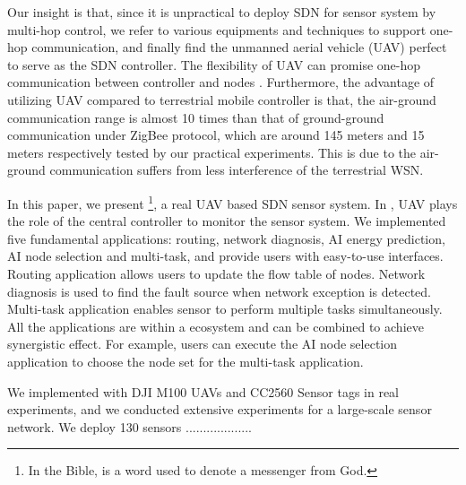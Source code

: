 Our insight is that, since it is unpractical to deploy SDN 
for sensor system by multi-hop control,
we refer to various equipments and techniques to support one-hop communication, 
and finally find the unmanned aerial vehicle (UAV) \cite{Cambone2005Unmanned, Perry2000Unmanned, Cathcart2014Method}
perfect to serve as the SDN controller. The flexibility
of UAV can promise one-hop communication between controller
and nodes \cite{Sara2016a}. Furthermore, the advantage of utilizing UAV compared to
terrestrial mobile controller is that, the air-ground communication range
is almost 10 times than that of ground-ground communication under ZigBee protocol, which are
around 145 meters and 15 meters respectively tested by our practical experiments.
This is due to the air-ground communication suffers from less interference of the terrestrial WSN.
 

In this paper, we present {\sdn}\footnote{In the Bible, {\sdn} is a word used to denote a messenger from God. }, 
a real UAV based SDN sensor system.
In {\sdn}, UAV plays the role of the central controller to monitor the sensor system.
We implemented five fundamental applications: routing, network diagnosis, 
AI energy prediction, AI node selection and multi-task,
and provide users with easy-to-use interfaces.
Routing application allows users to update the flow table of nodes.
Network diagnosis is used to find the fault source when network exception is detected.
Multi-task application enables sensor to perform multiple 
tasks simultaneously. All the applications are within a ecosystem
and can be combined to achieve synergistic effect. For example,
users can execute the AI node selection application to choose
the node set for the multi-task application. 


We implemented {\sdn} with DJI M100 UAVs and CC2560 Sensor tags in real experiments, and we conducted extensive experiments for a large-scale sensor network. We deploy 130 sensors ...................
\iffalse
Adler improves localization accuracy of $20$ sensors by reducing $78.4\%$ root-mean-square error (RMSE) compared to methods by multi-hop networks or mobile vehicles. Adler achieves about $10\%$ higher package receiving ratio compared to notable mobile sink methods for gathering application. Adler reduces sensors' average energy consumption by about $80\%$ compared to multi-hop based methods. When the number of sensor nodes increases or some nodes run out of energy, Adler is more resilient and holds better performance than the state-of-the-art methods.
\fi

